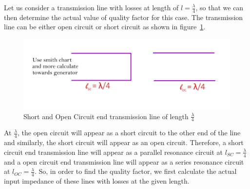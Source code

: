 


Let us consider a transmission line with losses at length of $ l=\frac{\lambda}{4} $, so that we can then determine the actual value of quality factor for this case. The transmission line can be either open circuit or short circuit as shown in figure~\ref{fig:fig1}.
\begin{figure}[h]
\centering
\includegraphics[width=1\linewidth]{./graphics/fig1}
\caption{Short and Open Circuit end transmission line of length $\frac{\lambda}{4}$}
\label{fig:fig1}
\end{figure}

At $ \frac{\lambda}{4} $, the open circuit will appear as a short circuit to the other end of the line and similarly, the short circuit will appear as an open circuit. Therefore, a short circuit end transmission line will appear as a parallel resonance circuit at $ l_{SC}=\frac{\lambda}{4} $ and a open circuit end transmission line will appear as a series resonance circuit at $ l_{OC}=\frac{\lambda}{4} $. So, in order to find the quality factor, we first calculate the actual input impedance of these lines with losses at the given length.

